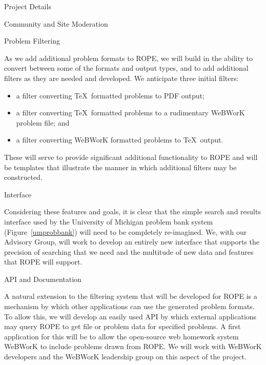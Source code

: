 \documentclass[11pt]{article}
\begin{document}
\begin{section}{Project Details}
\begin{subsection}{Community and Site Moderation}
\end{subsection}

\begin{subsection}{Problem Filtering}

As we add additional problem formats to ROPE, we will build in the
ability to convert between some of the formats and output types, and to
add additional filters as they are needed and developed. We anticipate
three initial filters:
\begin{itemize}
  \item
    a filter converting \TeX\ formatted problems to PDF output;
  \item
    a filter converting \TeX\ formatted problems to a rudimentary WeBWorK
    problem file; and
  \item
    a filter converting WeBWorK formatted problems to \TeX\ output. 
\end{itemize}
These will serve to provide significant additional functionality to ROPE and will be templates that illustrate the manner in which additional
filters may be constructed.

\end{subsection}

\begin{subsection}{Interface}

Considering these features and goals, it is clear that the simple search
and results interface used by the University of Michigan problem bank
system (Figure~\ref{umprobbank}) will need to be completely re-imagined.
We, with our Advisory Group, will work to develop an entirely new
interface that supports the precision of searching that we need and the
multitude of new data and features that ROPE will support.

\end{subsection}

\begin{subsection}{API and Documentation}

A natural extension to the filtering system that will be developed for ROPE is a mechanism by which other applications can use the generated
problem formats. To allow this, we will develop an easily used API by
which external applications may query ROPE to get file or problem data
for specified problems. A first application for this will be to allow the
open-source web homework system WeBWorK to include problems drawn from ROPE.  We will work with WeBWorK developers and the WeBWorK leadership
group on this aspect of the project.

\end{subsection}

\end{section}
\end{document}

